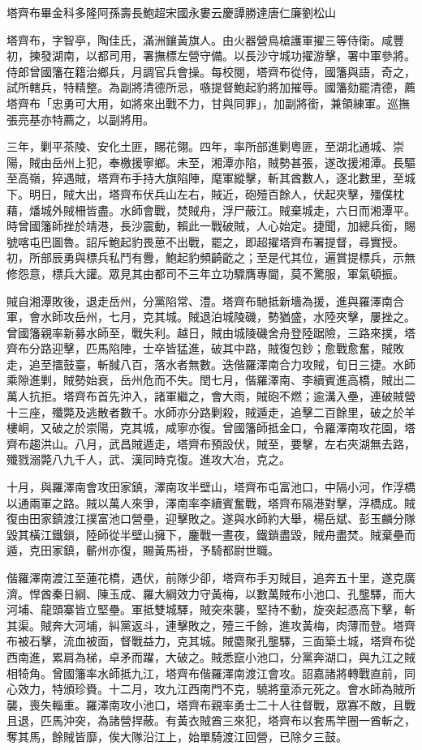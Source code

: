 
\begin{pinyinscope}
塔齊布畢金科多隆阿孫壽長鮑超宋國永婁云慶譚勝達唐仁廉劉松山

塔齊布，字智亭，陶佳氏，滿洲鑲黃旗人。由火器營鳥槍護軍擢三等侍衛。咸豐初，揀發湖南，以都司用，署撫標左營守備。以長沙守城功擢游擊，署中軍參將。侍郎曾國籓在籍治鄉兵，月調官兵會操。每校閱，塔齊布從侍，國籓與語，奇之，試所轄兵，特精整。為副將清德所忌，嗾提督鮑起豹將加摧辱。國籓劾罷清德，薦塔齊布「忠勇可大用，如將來出戰不力，甘與同罪」，加副將銜，兼領練軍。巡撫張亮基亦特薦之，以副將用。

三年，剿平茶陵、安化土匪，賜花翎。四年，率所部進剿粵匪，至湖北通城、崇陽，賊由岳州上犯，奉檄援寧鄉。未至，湘潭亦陷，賊勢甚張，遂改援湘潭。長驅至高嶺，猝遇賊，塔齊布手持大旗陷陣，麾軍縱擊，斬其酋數人，逐北數里，至城下。明日，賊大出，塔齊布伏兵山左右，賊近，砲殪百餘人，伏起夾擊，殭僕枕藉，燔城外賊柵皆盡。水師會戰，焚賊舟，浮尸蔽江。賊棄城走，六日而湘潭平。時曾國籓師挫於靖港，長沙震動，賴此一戰破賊，人心始定。捷聞，加總兵銜，賜號喀屯巴圖魯。詔斥鮑起豹畏葸不出戰，罷之，即超擢塔齊布署提督，尋實授。初，所部辰勇與標兵私鬥有釁，鮑起豹頻齮齕之；至是代其位，遍賞提標兵，示無修怨意，標兵大讙。眾見其由都司不三年立功驟膺專閫，莫不驚服，軍氣頓振。

賊自湘潭敗後，退走岳州，分黨陷常、澧。塔齊布馳抵新墻為援，進與羅澤南合軍，會水師攻岳州，七月，克其城。賊退泊城陵磯，勢猶盛，水陸夾擊，屢挫之。曾國籓親率新募水師至，戰失利。越日，賊由城陵磯舍舟登陸踞險，三路來撲，塔齊布分路迎擊，匹馬陷陣，士卒皆猛進，破其中路，賊復包鈔；愈戰愈奮，賊敗走，追至擂鼓臺，斬馘八百，落水者無數。迭偕羅澤南合力攻賊，旬日三捷。水師乘隙進剿，賊勢始衰，岳州危而不失。閏七月，偕羅澤南、李續賓進高橋，賊出二萬人抗拒。塔齊布首先沖入，諸軍繼之，會大雨，賊砲不燃；逾溝入壘，連破賊營十三座，殲斃及逃散者數千。水師亦分路剿殺，賊遁走，追擊二百餘里，破之於羊樓峒，又破之於崇陽，克其城，咸寧亦復。曾國籓師抵金口，令羅澤南攻花園，塔齊布趨洪山。八月，武昌賊遁走，塔齊布預設伏，賊至，要擊，左右夾湖無去路，殲戮溺斃八九千人，武、漢同時克復。進攻大冶，克之。

十月，與羅澤南會攻田家鎮，澤南攻半壁山，塔齊布屯富池口，中隔小河，作浮橋以通兩軍之路。賊以萬人來爭，澤南率李續賓奮戰，塔齊布隔港對擊，浮橋成。賊復由田家鎮渡江撲富池口營壘，迎擊敗之。遂與水師約大舉，楊岳斌、彭玉麟分隊毀其橫江鐵鎖，陸師從半壁山擁下，鏖戰一晝夜，鐵鎖盡毀，賊舟盡焚。賊棄壘而遁，克田家鎮，蘄州亦復，賜黃馬褂，予騎都尉世職。

偕羅澤南渡江至蓮花橋，遇伏，前隊少卻，塔齊布手刃賊目，追奔五十里，遂克廣濟。悍酋秦日綱、陳玉成、羅大綱效力守黃梅，以數萬賊布小池口、孔壟驛，而大河埔、龍頭寨皆立堅壘。軍抵雙城驛，賊突來襲，堅持不動，旋突起憑高下擊，斬其渠。賊奔大河埔，糾黨返斗，連擊敗之，殪三千餘，進攻黃梅，肉薄而登。塔齊布被石擊，流血被面，督戰益力，克其城。賊麕聚孔壟驛，三面築土城，塔齊布從西南進，累肩為梯，卓矛而躍，大破之。賊悉竄小池口，分黨奔湖口，與九江之賊相犄角。曾國籓率水師抵九江，塔齊布偕羅澤南渡江會攻。詔嘉諸將轉戰直前，同心效力，特頒珍賚。十二月，攻九江西南門不克，驍將童添元死之。會水師為賊所襲，喪失輜重。羅澤南攻小池口，塔齊布親率勇士二十人往督戰，眾寡不敵，且戰且退，匹馬沖突，為諸營捍蔽。有黃衣賊酋三來犯，塔齊布以套馬竿圈一酋斬之，奪其馬，餘賊皆靡，俟大隊沿江上，始單騎渡江回營，已除夕三鼓。


\end{pinyinscope}
